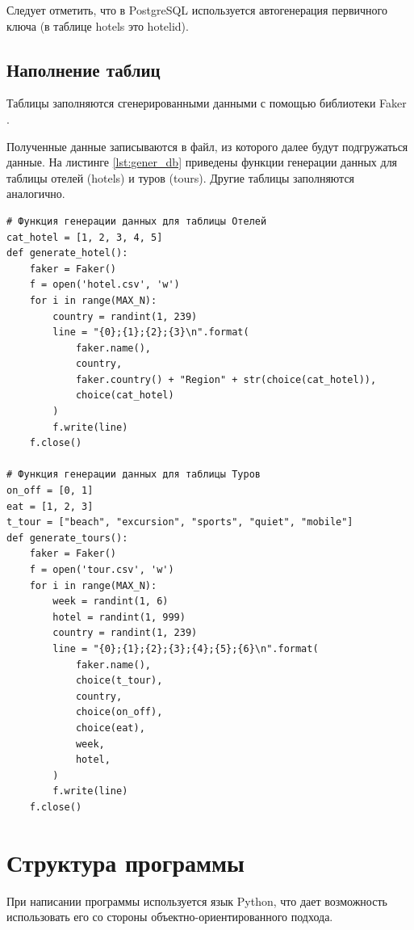 Следует отметить, что в PostgreSQL используется автогенерация первичного ключа (в таблице hotels это hotelid). 

\subsection{Наполнение таблиц}

Таблицы заполняются сгенерированными данными с помощью библиотеки Faker \cite{faker}.

Полученные данные записываются в файл, из которого далее будут подгружаться данные. На листинге \ref{lst:gener_db} приведены функции генерации данных для таблицы отелей (hotels) и туров (tours). Другие таблицы заполняются аналогично.

\begin{lstlisting}[label=lst:gener_db,caption=Генерация данных для таблиц]
# Функция генерации данных для таблицы Отелей
cat_hotel = [1, 2, 3, 4, 5]
def generate_hotel():
	faker = Faker()
	f = open('hotel.csv', 'w')
	for i in range(MAX_N):
		country = randint(1, 239)
		line = "{0};{1};{2};{3}\n".format(
			faker.name(),
			country,
			faker.country() + "Region" + str(choice(cat_hotel)),
			choice(cat_hotel)
		)
		f.write(line)
	f.close()
	
# Функция генерации данных для таблицы Туров
on_off = [0, 1]
eat = [1, 2, 3]
t_tour = ["beach", "excursion", "sports", "quiet", "mobile"]
def generate_tours():
	faker = Faker()
	f = open('tour.csv', 'w')
	for i in range(MAX_N):
		week = randint(1, 6)
		hotel = randint(1, 999)
		country = randint(1, 239)
		line = "{0};{1};{2};{3};{4};{5};{6}\n".format(
			faker.name(),
			choice(t_tour),
			country,
			choice(on_off),
			choice(eat),
			week,
			hotel,
		)
		f.write(line)
	f.close()

\end{lstlisting}

\section{Структура программы}

При написании программы используется язык Python, что дает возможность использовать его со стороны объектно-ориентированного подхода.

